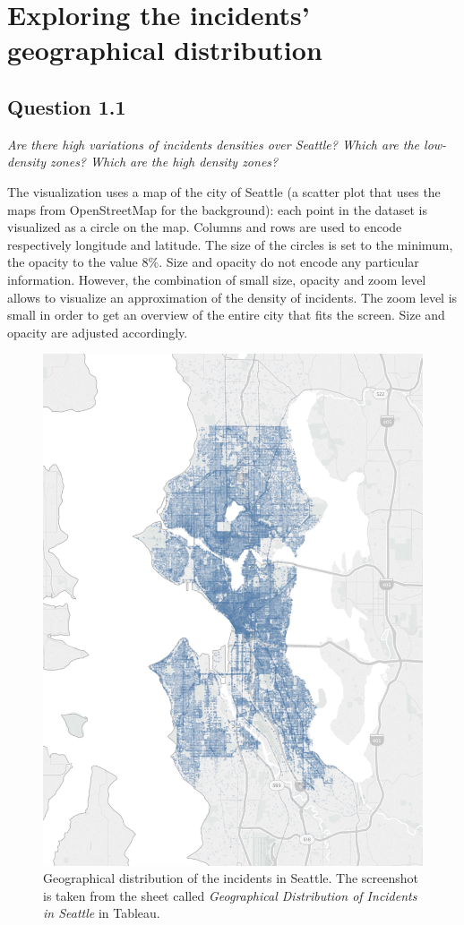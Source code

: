 \section{Exploring the incidents' geographical distribution}
\label{sec:question1}

\subsection*{Question 1.1}
\textit{Are there high variations of incidents densities over Seattle? Which are the low-density zones? Which are the high density zones?}

The visualization uses a map of the city of Seattle (a scatter plot that uses the maps from OpenStreetMap for the background):
each point in the dataset is visualized as a circle on the map.
Columns and rows are used to encode respectively longitude and latitude.
The size of the circles is set to the minimum, the opacity to the value $8\%$.
Size and opacity do not encode any particular information.
However, the combination of small size, opacity and zoom level allows to visualize an approximation of the density of incidents.
The zoom level is small in order to get an overview of the entire city that fits the screen.
Size and opacity are adjusted accordingly.

\begin{figure}[h]
	\centering
	\includegraphics[width=.75\columnwidth]{figures/1_1_geographical_distribution_incidents}
	\caption{Geographical distribution of the incidents in Seattle. The screenshot is taken from the sheet called \textit{Geographical Distribution of Incidents in Seattle} in Tableau.}
	\label{fig:1_1_geographical_distribution_incidents}
\end{figure}

